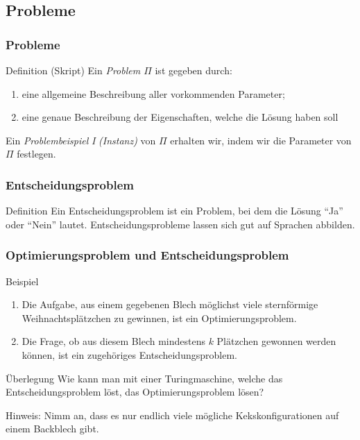 \subsection{Probleme}
\begin{frame}
 \frametitle{Probleme}
 \begin{block}{Definition (Skript)}
 Ein \emph{Problem $\Pi$} ist gegeben durch:
 \begin{enumerate}
  \item eine allgemeine Beschreibung aller vorkommenden Parameter;
  \item eine genaue Beschreibung der Eigenschaften, welche die Lösung haben soll
 \end{enumerate}
 \end{block}
 Ein \emph{Problembeispiel} \textit{I} \emph{(Instanz)} von $\Pi$ erhalten wir, indem wir die Parameter von $\Pi$ festlegen.
\end{frame}

\begin{frame}
 \frametitle{Entscheidungsproblem}
 \begin{block}{Definition}
  Ein Entscheidungsproblem ist ein Problem, bei dem die Lösung "`Ja"' oder "`Nein"' lautet. 
  Entscheidungsprobleme lassen sich gut auf Sprachen abbilden.
 \end{block}
\end{frame}

\begin{frame}
 \frametitle{Optimierungsproblem und Entscheidungsproblem}
 \begin{block}{Beispiel}
  \begin{enumerate}
   \item Die Aufgabe, aus einem gegebenen Blech möglichst viele sternförmige Weihnachtsplätzchen zu gewinnen, ist ein Optimierungsproblem.
   \item Die Frage, ob aus diesem Blech mindestens $k$ Plätzchen gewonnen werden können, ist ein zugehöriges Entscheidungsproblem.
  \end{enumerate}
 \end{block}
 \begin{block}{Überlegung}
  Wie kann man mit einer Turingmaschine, welche das Entscheidungsproblem löst, das Optimierungsproblem lösen?
 \end{block}
 Hinweis: Nimm an, dass es nur endlich viele mögliche Kekskonfigurationen auf einem Backblech gibt.
\end{frame}


